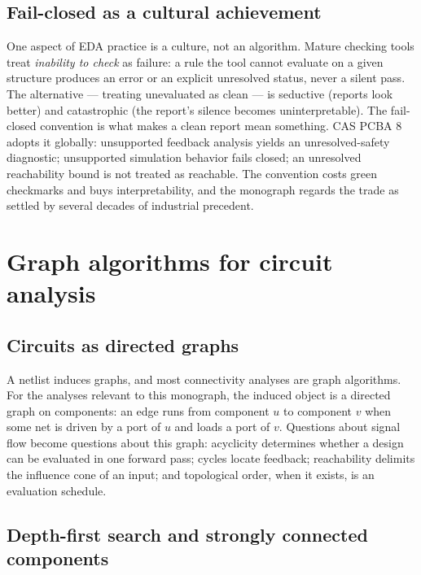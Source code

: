 \subsection{Fail-closed as a cultural achievement}\label{ch02:eda:failclosed}

One aspect of EDA practice is a culture, not an algorithm. Mature checking tools treat \emph{inability to
check} as failure: a rule the tool cannot evaluate on a given structure
produces an error or an explicit unresolved status, never a silent pass.
The alternative --- treating unevaluated as clean --- is seductive
(reports look better) and catastrophic (the report's silence becomes
uninterpretable). The fail-closed convention is what makes a clean report
mean something. CAS PCBA 8 adopts it globally: unsupported feedback
analysis yields an unresolved-safety diagnostic; unsupported simulation
behavior fails closed; an unresolved reachability bound is not treated as
reachable. The convention costs green checkmarks and buys interpretability,
and the monograph regards the trade as settled by several decades of
industrial precedent.

\section{Graph algorithms for circuit analysis}\label{ch02:graphs}

\subsection{Circuits as directed graphs}\label{ch02:graphs:directed}

A netlist induces graphs, and most connectivity analyses are graph
algorithms. For the analyses relevant to this monograph, the induced
object is a directed graph on components: an edge runs from component $u$
to component $v$ when some net is driven by a port of $u$ and loads a
port of $v$. Questions about signal flow become questions about this
graph: acyclicity determines whether a design can be evaluated in one
forward pass; cycles locate feedback; reachability delimits the influence
cone of an input; and topological order, when it exists, is an
evaluation schedule.

\subsection{Depth-first search and strongly connected components}\label{ch02:graphs:tarjan}

